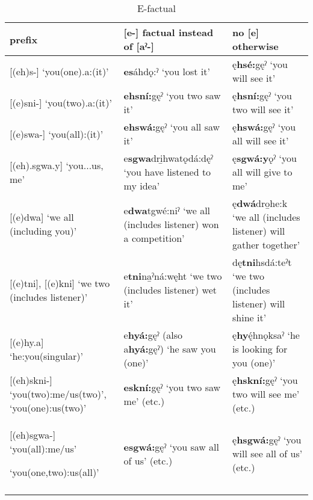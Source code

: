\begin{table}
\caption{E-factual}
\label{tab:1:efact}
\scriptsize{
\begin{tabularx}{\textwidth}{XXX}
\lsptoprule
prefix & [e-] factual instead of [aˀ-] & no [e] otherwise \\
\midrule
{}[(eh)s-] ‘you(one).a:(it)’ & \textbf{es}áhdǫ:ˀ ‘you lost it’ & ę\textbf{hsé:}gęˀ ‘you will see it’\\
{}[(e)sni-] ‘you(two).a:(it)’ & \textbf{ehsní:}gęˀ ‘you two saw it’ & ę\textbf{hsní:}gęˀ ‘you two will see it’\\
{}[(e)swa-] ‘you(all):(it)’ & \textbf{ehswá:}gęˀ ‘you all saw it’ & ę\textbf{hswá:}gęˀ ‘you all will see it’\\
{}[(eh).sgwa.y] ‘you...us, me’ & e\textbf{sgwa}dri̱hwatǫdá:dęˀ ‘you have listened to my idea’ & ę\textbf{sgwá:y}ǫˀ ‘you all will give to me’\\
{}[(e)dwa] ‘we all (including you)’ & e\textbf{dwa}tgwé:niˀ ‘we all (includes listener) won a competition’ & ę\textbf{dwá}dro̱he:k ‘we all (includes listener) will gather together’\\
{}[(e)tni], [(e)kni] ‘we two (includes listener)’ & e\textbf{tni}na̱ˀná:węht ‘we two (includes listener) wet it’ & dę\textbf{tni}hsdá:teˀt ‘we two (includes listener) will shine it’\\
{}[(e)hy.a] ‘he:you(singular)’ & e\textbf{hyá:}gęˀ (also a\textbf{hyá:}gęˀ) ‘he saw you (one)’ & ę\textbf{hy}\'{ę}hnǫksaˀ ‘he is looking for you (one)’\\
{}[(eh)skni-] ‘you(two):me/us(two)’, ‘you(one):us(two)’ & \textbf{eskní:}gęˀ ‘you two saw me’ (etc.) & ę\textbf{hskní:}gęˀ ‘you two will see me’ (etc.)\\
{}[(eh)sgwa-] ‘you(all):me/us’

‘you(one,two):us(all)’ & \textbf{esgwá:}gęˀ ‘you saw all of us’ (etc.) & ę\textbf{hsgwá:}gęˀ ‘you will see all of us’ (etc.)\\
\lspbottomrule
\end{tabularx}}
\end{table}

\lipsum[1-1]


